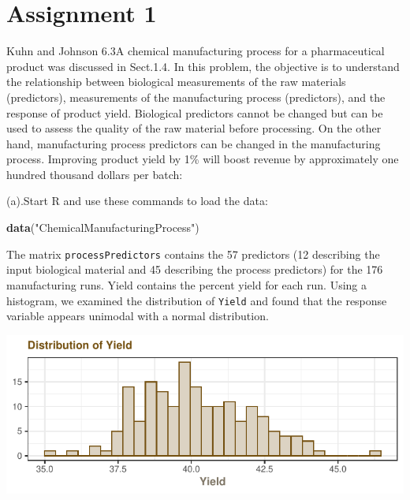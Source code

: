 \documentclass[]{report}
\newenvironment{Shaded}{\begin{snugshade}}{\end{snugshade}}
\newcommand{\KeywordTok}[1]{\textcolor[rgb]{0.13,0.29,0.53}{\textbf{#1}}}
\newcommand{\NormalTok}[1]{#1}
\newcommand{\StringTok}[1]{\textcolor[rgb]{0.31,0.60,0.02}{#1}}
\begin{document}
\newpage

\hypertarget{AS-1}{%
\chapter*{Assignment 1}\label{AS-1}}


\begin{question}{Kuhn and Johnson 6.3}A chemical manufacturing process for a pharmaceutical product was discussed in Sect.1.4. In this problem, the objective is to understand the relationship between biological measurements of the raw materials (predictors), measurements of the manufacturing process (predictors), and the response of product yield. Biological predictors cannot be changed but can be used to assess the quality of the raw material before processing. On the other hand, manufacturing process predictors can be changed in the manufacturing process. Improving product yield by 1\% will boost revenue by approximately one hundred thousand dollars per batch:\end{question}

\begin{subquestion}{(a).}Start R and use these commands to load the data:
\end{subquestion}

\begin{Shaded}
\begin{Highlighting}[]
\KeywordTok{data}\NormalTok{(}\StringTok{"ChemicalManufacturingProcess"}\NormalTok{)}
\end{Highlighting}
\end{Shaded}

The matrix \texttt{processPredictors} contains the 57 predictors (12
describing the input biological material and 45 describing the process
predictors) for the 176 manufacturing runs. Yield contains the percent
yield for each run. Using a histogram, we examined the distribution of
\texttt{Yield} and found that the response variable appears unimodal
with a normal distribution.

\begin{center}\includegraphics{Homework-Two_files/figure-latex/kj-6.3a-plot-1} \end{center}
\end{document}
